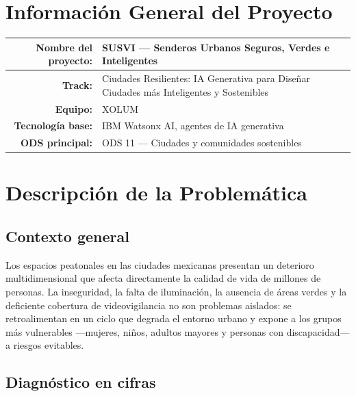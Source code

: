 \documentclass[12pt,a4paper]{article}
\begin{document}
\tableofcontents
\newpage

\section{Información General del Proyecto}

\begin{table}[H]
\centering
\begin{tabularx}{\textwidth}{r X}
\toprule
\textbf{Nombre del proyecto:} & SUSVI — Senderos Urbanos Seguros, Verdes e Inteligentes \\
\midrule
\textbf{Track:} & Ciudades Resilientes: IA Generativa para Diseñar Ciudades más Inteligentes y Sostenibles \\
\midrule
\textbf{Equipo:} & XOLUM \\
\midrule
\textbf{Tecnología base:} & IBM Watsonx AI, agentes de IA generativa \\
\midrule
\textbf{ODS principal:} & ODS 11 — Ciudades y comunidades sostenibles \\
\bottomrule
\end{tabularx}
\end{table}


\section{Descripción de la Problemática}

\subsection{Contexto general}

Los espacios peatonales en las ciudades mexicanas presentan un deterioro multidimensional que afecta directamente la calidad de vida de millones de personas. La inseguridad, la falta de iluminación, la ausencia de áreas verdes y la deficiente cobertura de videovigilancia no son problemas aislados: se retroalimentan en un ciclo que degrada el entorno urbano y expone a los grupos más vulnerables —mujeres, niños, adultos mayores y personas con discapacidad— a riesgos evitables.

\subsection{Diagnóstico en cifras}
\end{document}
